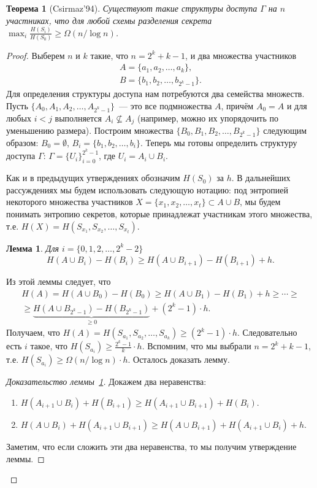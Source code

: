 \documentclass[12pt]{article}
\newcommand{\seqn}[2]{{#1}_1,{#1}_2,\dotsc,{#1}_{#2}}
\newcommand{\seqin}[3]{{#1}_{{#2}_1},{#1}_{{#2}_2},\dotsc,{#1}_{{#2}_{#3}}}
\theoremstyle{definition}
\theoremstyle{plain}
\newtheorem{theorem}{Теорема}[section]
\newtheorem{lemma}{Лемма}[section]
\theoremstyle{remark}
\begin{document}
\begin{theorem}[Csirmaz'94]
    Существуют такие структуры доступа $\Gamma$ на $n$ участниках, что для любой схемы разделения
    секрета $\max_i\frac{H(S_i)}{H(S_0)} \ge \Omega(n/\log n)$.
\end{theorem}
\begin{proof}
    Выберем $n$ и $k$ такие, что $n = 2^k + k - 1$, и два множества участников 
    \[
        \begin{array}{l}
            A = \{\seqn{a}{k}\},\\
            B = \{\seqn{b}{2^k - 1}\}.
        \end{array}
    \]
    Для определения структуры доступа нам потребуются два семейства множеств. 
    Пусть $\{A_0,\seqn{A}{2^k-1}\}$~--- это все подмножества $A$, причём $A_0 = A$ и для любых
    $i < j$ выполняется $A_i\not\subseteq A_j$ (например, можно их упорядочить по уменьшению
    размера). Построим множества $\{B_0,\seqn{B}{2^k - 1}\}$ следующим образом: $B_0 = \emptyset$, 
    $B_i = \{\seqn{b}{i}\}$.  
    Теперь мы готовы определить структуру доступа $\Gamma$: $\Gamma = \{U_i\}_{i=0}^{2^k-1}$, где $U_i =
    A_i\cup B_i$. 
    
    Как и в предыдущих утверждениях обозначим $H(S_0)$ за $h$.
    В дальнейших рассуждениях мы будем использовать следующую нотацию: под энтропией некоторого
    множества участников $X = \{\seqn{x}{t}\}\subset A\cup B$, мы будем понимать энтропию секретов, которые
    принадлежат участникам этого множества, т.е. $H(X) = H(\seqin{S}{x}{t})$.

    \begin{lemma}\label{lm:secretlb} Для $i=\{0,1,2,\dots,2^k-2\}$
        \[
            H(A\cup B_i) - H(B_i) \ge H(A\cup B_{i+1}) - H(B_{i+1}) + h.
        \]
    \end{lemma}
    Из этой леммы следует, что 
    \begin{multline*}
        H(A) = H(A\cup B_0) - H(B_0) \ge H(A\cup B_{1}) - H(B_1) + h \ge \dotsb \ge\\
        \ge \underbrace{H(A\cup B_{2^k-1}) - H(B_{2^k-1})}_{\ge 0} + (2^k - 1)\cdot h.
    \end{multline*}
    Получаем, что $H(A) = H(\seqin{S}{a}{k})\ge (2^k - 1) \cdot h$. Следовательно есть $i$ такое,
    что $H(S_{a_i})\ge \frac{2^k - 1}{k}\cdot h$.
    Вспомним, что мы выбрали $n = 2^k + k - 1$, т.е. $H(S_{a_i})\ge \Omega(n/\log n) \cdot h$.
    Осталось доказать лемму.
    \begin{proof}[Доказательство леммы~\ref{lm:secretlb}]
        Докажем два неравенства:
        \begin{enumerate}
            \item $H(A_{i+1}\cup B_i) + H(B_{i+1}) \ge  H(A_{i+1} \cup B_{i+1}) + H(B_i) $.
            \item $H(A\cup B_i) + H(A_{i+1}\cup B_{i+1}) \ge H(A\cup B_{i+1}) + H(A_{i+1}\cup B_i) + h$.
        \end{enumerate}
        Заметим, что если сложить эти два неравенства, то мы получим утверждение леммы.
    

\end{proof}
\end{proof}
\end{document}
